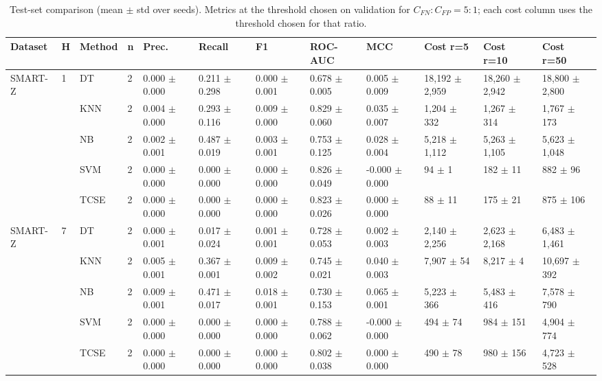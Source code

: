 \begin{table}[t]
\centering
\caption{Test-set comparison (mean $\pm$ std over seeds). Metrics at the threshold chosen on validation for $C_{FN}{:}C_{FP}=5{:}1$; each cost column uses the threshold chosen for that ratio.}
\label{tab:table1_main_comparison_r5}
\footnotesize
\begin{tabular}{llllllllllll}
\toprule
Dataset & H & Method & n & Prec. & Recall & F1 & ROC-AUC & MCC & Cost r=5 & Cost r=10 & Cost r=50 \\
\midrule
SMART-Z & 1 & DT & 2 & 0.000 $\pm$ 0.000 & 0.211 $\pm$ 0.298 & 0.000 $\pm$ 0.001 & 0.678 $\pm$ 0.005 & 0.005 $\pm$ 0.009 & 18,192 $\pm$ 2,959 & 18,260 $\pm$ 2,942 & 18,800 $\pm$ 2,800 \\
 &  & KNN & 2 & 0.004 $\pm$ 0.000 & 0.293 $\pm$ 0.116 & 0.009 $\pm$ 0.000 & 0.829 $\pm$ 0.060 & 0.035 $\pm$ 0.007 & 1,204 $\pm$ 332 & 1,267 $\pm$ 314 & 1,767 $\pm$ 173 \\
 &  & NB & 2 & 0.002 $\pm$ 0.001 & 0.487 $\pm$ 0.019 & 0.003 $\pm$ 0.001 & 0.753 $\pm$ 0.125 & 0.028 $\pm$ 0.004 & 5,218 $\pm$ 1,112 & 5,263 $\pm$ 1,105 & 5,623 $\pm$ 1,048 \\
 &  & SVM & 2 & 0.000 $\pm$ 0.000 & 0.000 $\pm$ 0.000 & 0.000 $\pm$ 0.000 & 0.826 $\pm$ 0.049 & -0.000 $\pm$ 0.000 & 94 $\pm$ 1 & 182 $\pm$ 11 & 882 $\pm$ 96 \\
 &  & TCSE & 2 & 0.000 $\pm$ 0.000 & 0.000 $\pm$ 0.000 & 0.000 $\pm$ 0.000 & 0.823 $\pm$ 0.026 & 0.000 $\pm$ 0.000 & 88 $\pm$ 11 & 175 $\pm$ 21 & 875 $\pm$ 106 \\
SMART-Z & 7 & DT & 2 & 0.000 $\pm$ 0.001 & 0.017 $\pm$ 0.024 & 0.001 $\pm$ 0.001 & 0.728 $\pm$ 0.053 & 0.002 $\pm$ 0.003 & 2,140 $\pm$ 2,256 & 2,623 $\pm$ 2,168 & 6,483 $\pm$ 1,461 \\
 &  & KNN & 2 & 0.005 $\pm$ 0.001 & 0.367 $\pm$ 0.001 & 0.009 $\pm$ 0.002 & 0.745 $\pm$ 0.021 & 0.040 $\pm$ 0.003 & 7,907 $\pm$ 54 & 8,217 $\pm$ 4 & 10,697 $\pm$ 392 \\
 &  & NB & 2 & 0.009 $\pm$ 0.001 & 0.471 $\pm$ 0.017 & 0.018 $\pm$ 0.001 & 0.730 $\pm$ 0.153 & 0.065 $\pm$ 0.001 & 5,223 $\pm$ 366 & 5,483 $\pm$ 416 & 7,578 $\pm$ 790 \\
 &  & SVM & 2 & 0.000 $\pm$ 0.000 & 0.000 $\pm$ 0.000 & 0.000 $\pm$ 0.000 & 0.788 $\pm$ 0.062 & -0.000 $\pm$ 0.000 & 494 $\pm$ 74 & 984 $\pm$ 151 & 4,904 $\pm$ 774 \\
 &  & TCSE & 2 & 0.000 $\pm$ 0.000 & 0.000 $\pm$ 0.000 & 0.000 $\pm$ 0.000 & 0.802 $\pm$ 0.038 & 0.000 $\pm$ 0.000 & 490 $\pm$ 78 & 980 $\pm$ 156 & 4,723 $\pm$ 528 \\

\end{tabular}
\end{table}
